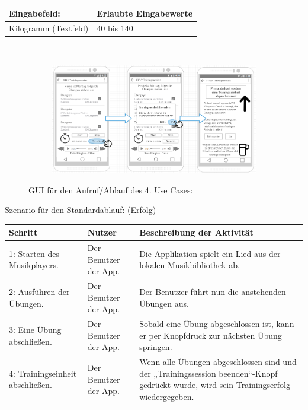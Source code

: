 \documentclass[FIPLY_base.tex]{subfiles}
\begin{document}
	\begin{center}
		\def\arraystretch{1.3}%
		\begin{tabular}{| p{5cm} | p{5cm} |}
			\hline
			\textbf{Eingabefeld:} & \textbf{Erlaubte Eingabewerte} \\ \hline 
			Kilogramm (Textfeld) & 40 bis 140 \\ \hline
		\end{tabular} \\
	\end{center}	
	\begin{figure}[H]
		\begin{subfigure}[b]{0.3\textwidth}
			\includegraphics[scale=0.4]{img/Trainingssessionabgeschlossen}
		\end{subfigure}
		\caption{GUI für den Aufruf/Ablauf des 4. Use Cases:}
	\end{figure}
	Szenario für den Standardablauf: (Erfolg)
	\begin{center}	
		\def\arraystretch{1.3}%
		\begin{tabular}{| p{3cm} | p{3cm} | p{6cm} |}
			\hline
			\textbf{Schritt} & \textbf{Nutzer} & \textbf{Beschreibung der Aktivität}  \\ \hline 
			1: Starten des Musikplayers. & Der Benutzer der App. & Die Applikation spielt ein Lied aus der lokalen Musikbibliothek ab.\\ \hline
			2: Ausführen der Übungen. & Der Benutzer der App. & Der Benutzer führt nun die anstehenden Übungen aus. \\ \hline
			3: Eine Übung abschließen. & Der Benutzer der App. & Sobald eine Übung abgeschlossen ist, kann er per Knopfdruck zur nächsten Übung springen.  \\ \hline
			4: Trainingseinheit abschließen. & Der Benutzer der App. & Wenn alle Übungen abgeschlossen sind und der „Trainingssession beenden“-Knopf gedrückt wurde, wird sein Trainingserfolg wiedergegeben.  \\ \hline
		\end{tabular} \\
	\end{center}
\end{document}

